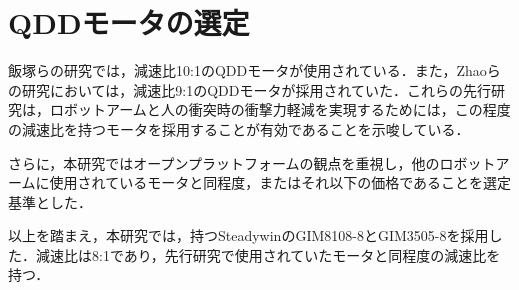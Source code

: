 \section{QDDモータの選定}
飯塚ら\cite{飯塚浩太2021}の研究では，減速比10:1のQDDモータが使用されている．また，Zhaoら\cite{10106520}の研究においては，減速比9:1のQDDモータが採用されていた．これらの先行研究は，ロボットアームと人の衝突時の衝撃力軽減を実現するためには，この程度の減速比を持つモータを採用することが有効であることを示唆している．

さらに，本研究ではオープンプラットフォームの観点を重視し，他のロボットアームに使用されているモータと同程度，またはそれ以下の価格であることを選定基準とした．

以上を踏まえ，本研究では，持つSteadywinのGIM8108-8とGIM3505-8を採用した．減速比は8:1であり，先行研究で使用されていたモータと同程度の減速比を持つ．
